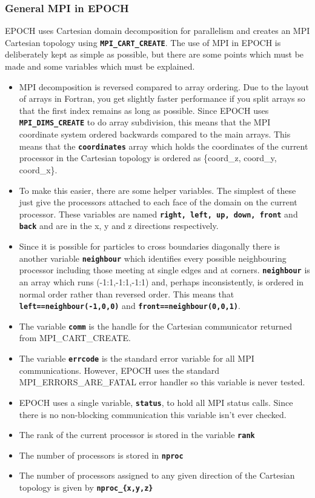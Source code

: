 \documentclass[12pt]{article}
\newcommand{\inlinecode}[1]{{\color{warwickred} \bf\texttt{#1}}}
\newcommand{\nEPOCH}{{\color{warwickdark}\fontfamily{phv}\selectfont EPOCH}}
\newcommand{\EPOCH}{{\nEPOCH} }
\begin{document}
\subsubsection{General MPI in \EPOCH}
\EPOCH uses Cartesian domain decomposition for parallelism and creates an MPI
Cartesian topology using \inlinecode{MPI\_CART\_CREATE}.  The use of MPI in
\EPOCH is deliberately kept as simple as possible, but there are some points
which must be made and some variables which must be explained.
\begin{itemize}
\item MPI decomposition is reversed compared to array ordering. Due to the
  layout of arrays in Fortran, you get slightly faster performance if you split
  arrays so that the first index remains as long as possible. Since \EPOCH uses
  \inlinecode{MPI\_DIMS\_CREATE} to do array subdivision, this means that the
  MPI coordinate system ordered backwards compared to the main arrays. This
  means that the \inlinecode{coordinates} array which holds the coordinates of
  the current processor in the Cartesian topology is ordered as \{coord\_z,
  coord\_y, coord\_x\}.
\item To make this easier, there are some helper variables. The simplest of
  these just give the processors attached to each face of the domain on the
  current processor. These variables are named \inlinecode{right, left, up,
    down, front} and \inlinecode{back} and are in the x, y and z directions
  respectively.
\item Since it is possible for particles to cross boundaries diagonally there
  is another variable \inlinecode{neighbour} which identifies every possible
  neighbouring processor including those meeting at single edges and at
  corners. \inlinecode{neighbour} is an array which runs (-1:1,-1:1,-1:1) and,
  perhaps inconsistently, is ordered in normal order rather than reversed
  order. This means that \inlinecode{left==neighbour(-1,0,0)} and
  \inlinecode{front==neighbour(0,0,1)}.
\item The variable \inlinecode{comm} is the handle for the Cartesian
  communicator returned from MPI\_CART\_CREATE.
\item The variable \inlinecode{errcode} is the standard error variable for all
  MPI communications. However, \EPOCH uses the standard MPI\_ERRORS\_ARE\_FATAL
  error handler so this variable is never tested.
\item \EPOCH uses a single variable, \inlinecode{status}, to hold all MPI
  status calls. Since there is no non-blocking communication this variable
  isn't ever checked.
\item The rank of the current processor is stored in the variable
  \inlinecode{rank}
\item The number of processors is stored in \inlinecode{nproc}
\item The number of processors assigned to any given direction of the Cartesian
  topology is given by \inlinecode{nproc\_\{x,y,z\}}
\end{itemize}
\end{document}
